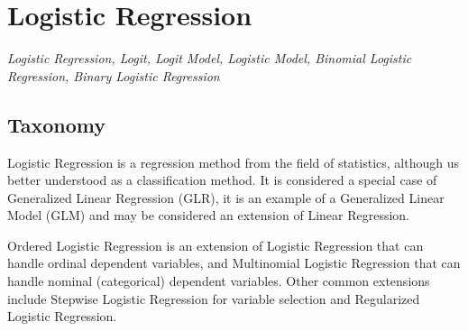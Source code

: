 

\section{Logistic Regression} 
\label{sec:logistic}

\emph{Logistic Regression, Logit, Logit Model, Logistic Model, Binomial Logistic Regression, Binary Logistic Regression}

\subsection{Taxonomy}
Logistic Regression is a regression method from the field of statistics, although us better understood as a classification method. It is considered a special case of Generalized Linear Regression (GLR), it is an example of a Generalized Linear Model (GLM) and may be considered an extension of Linear Regression.

Ordered Logistic Regression is an extension of Logistic Regression that can handle ordinal dependent variables, and Multinomial Logistic Regression that can handle nominal (categorical) dependent variables. Other common extensions include Stepwise Logistic Regression for variable selection and Regularized Logistic Regression.

